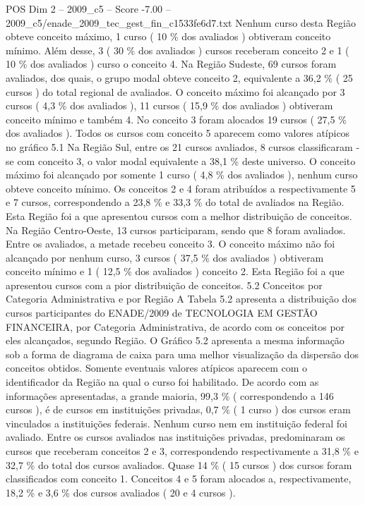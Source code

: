 \begin{textsample}{POS Dim 2 – 2009\_c5 – Score -7.00 – 2009\_c5/enade\_2009\_tec\_gest\_fin\_c1533fe6d7.txt}
Nenhum curso desta Região obteve conceito máximo, 1 curso ( 10 \% dos avaliados ) obtiveram conceito mínimo.
Além desse, 3 ( 30 \% dos avaliados ) cursos receberam conceito 2 e 1 ( 10 \% dos avaliados ) curso o conceito 4.
Na Região Sudeste, 69 cursos foram avaliados, dos quais, o grupo modal obteve conceito 2, equivalente a 36,2 \% ( 25 cursos ) do total regional de avaliados.
O conceito máximo foi alcançado por 3 cursos ( 4,3 \% dos avaliados ), 11 cursos ( 15,9 \% dos avaliados ) obtiveram conceito mínimo e também 4.
No conceito 3 foram alocados 19 cursos ( 27,5 \% dos avaliados ).
Todos os cursos com conceito 5 aparecem como valores atípicos no gráfico 5.1 Na Região Sul, entre os 21 cursos avaliados, 8 cursos classificaram -se com conceito 3, o valor modal equivalente a 38,1 \% deste universo.
O conceito máximo foi alcançado por somente 1 curso ( 4,8 \% dos avaliados ), nenhum curso obteve conceito mínimo.
Os conceitos 2 e 4 foram atribuídos a respectivamente 5 e 7 cursos, correspondendo a 23,8 \% e 33,3 \% do total de avaliados na Região.
Esta Região foi a que apresentou cursos com a melhor distribuição de conceitos.
Na Região Centro-Oeste, 13 cursos participaram, sendo que 8 foram avaliados.
Entre os avaliados, a metade recebeu conceito 3.
O conceito máximo não foi alcançado por nenhum curso, 3 cursos ( 37,5 \% dos avaliados ) obtiveram conceito mínimo e 1 ( 12,5 \% dos avaliados ) conceito 2.
Esta Região foi a que apresentou cursos com a pior distribuição de conceitos. 5.2 Conceitos por Categoria Administrativa e por Região A Tabela 5.2 apresenta a distribuição dos cursos participantes do ENADE/2009 de TECNOLOGIA EM GESTÃO FINANCEIRA, por Categoria Administrativa, de acordo com os conceitos por eles alcançados, segundo Região.
O Gráfico 5.2 apresenta a mesma informação sob a forma de diagrama de caixa para uma melhor visualização da dispersão dos conceitos obtidos.
Somente eventuais valores atípicos aparecem com o identificador da Região na qual o curso foi habilitado.
De acordo com as informações apresentadas, a grande maioria, 99,3 \% ( correspondendo a 146 cursos ), é de cursos em instituições privadas, 0,7 \% ( 1 curso ) dos cursos eram vinculados a instituições federais.
Nenhum curso nem em instituição federal foi avaliado.
Entre os cursos avaliados nas instituições privadas, predominaram os cursos que receberam conceitos 2 e 3, correspondendo respectivamente a 31,8 \% e 32,7 \% do total dos cursos avaliados.
Quase 14 \% ( 15 cursos ) dos cursos foram classificados com conceito 1.
Conceitos 4 e 5 foram alocados a, respectivamente, 18,2 \% e 3,6 \% dos cursos avaliados ( 20 e 4 cursos ).

\end{textsample}
